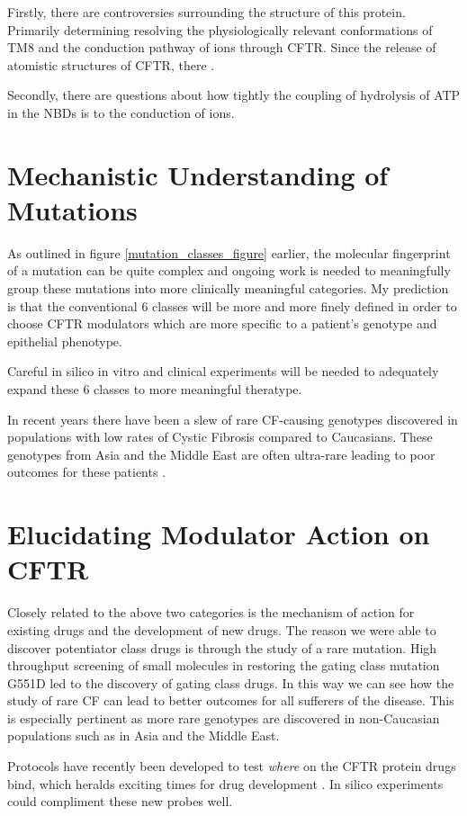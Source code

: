 Firstly, there are controversies surrounding the structure of this protein. Primarily determining resolving the physiologically relevant conformations of TM8 and the conduction pathway of ions through CFTR. Since the release of atomistic structures of CFTR, there .

Secondly, there are questions about how tightly the coupling of hydrolysis of ATP in the NBDs is to the conduction of ions.

\section{Mechanistic Understanding of Mutations}
As outlined in figure \ref{mutation_classes_figure} earlier, the molecular fingerprint of a mutation can be quite complex and ongoing work is needed to meaningfully group these mutations into more clinically meaningful categories. My prediction is that the conventional 6 classes will be more and more finely defined in order to choose CFTR modulators which are more specific to a patient's genotype and epithelial phenotype. 

Careful in silico in vitro and clinical experiments will be needed to adequately expand these 6 classes to more meaningful theratype.

In recent years there have been a slew of rare CF-causing genotypes discovered in populations with low rates of Cystic Fibrosis compared to Caucasians. These genotypes from Asia and the Middle East are often ultra-rare leading to poor outcomes for these patients \cite{}. 

\section{Elucidating Modulator Action on CFTR}

Closely related to the above two categories is the mechanism of action for existing drugs and the development of new drugs. The reason we were able to discover potentiator class drugs is through the study of a rare mutation. High throughput screening of small molecules in restoring the gating class mutation G551D led to the discovery of gating class drugs. In this way we can see how the study of rare CF can lead to better outcomes for all sufferers of the disease. This is especially pertinent as more rare genotypes are discovered in non-Caucasian populations such as in Asia and the Middle East.  

Protocols have recently been developed to test \textit{where} on the CFTR protein drugs bind, which heralds exciting times for drug development \cite{laselva2022}. In silico experiments could compliment these new probes well. 

